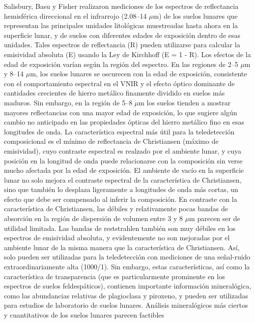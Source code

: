 \documentclass[12pt]{article}
\begin{document}
Salisbury, Basu y Fisher realizaron mediciones de los espectros de reflectancia hemisférica 
direccional en el 
infrarrojo (2.08–14 $\mu$m) de los suelos lunares que representan las 
principales unidades litológicas muestreadas hasta ahora en la superficie 
lunar, y de suelos con diferentes edades de exposición dentro de esas 
unidades. Tales espectros de reflectancia (R) pueden utilizarse para 
calcular la emisividad absoluta (E) usando la Ley de Kirchhoff (E = 1 - R). 
Los efectos de la edad de exposición varían según la región del espectro. 
En las regiones de 2–5 $\mu$m y 8–14 $\mu$m, los suelos lunares se oscurecen 
con la edad de exposición, consistente con el comportamiento espectral en el 
VNIR y el efecto óptico dominante de cantidades crecientes de hierro metálico 
finamente dividido en suelos más maduros. Sin embargo, en la región de 5–8 
$\mu$m los suelos tienden a mostrar mayores reflectancias con una mayor edad 
de exposición, lo que sugiere algún cambio no anticipado en las propiedades 
ópticas del hierro metálico fino en esas longitudes de onda. La característica 
espectral más útil para la teledetección composicional es el mínimo de 
reflectancia de Christiansen (máximo de emisividad), cuyo contraste espectral 
es realzado por el ambiente lunar, y cuya posición en la longitud de onda puede 
relacionarse con la composición sin verse mucho afectada por la edad de 
exposición. El ambiente de vacío en la superficie lunar no solo mejora el 
contraste espectral de la característica de Christiansen, sino que también lo 
desplaza ligeramente a longitudes de onda más cortas, un efecto que debe ser 
compensado al inferir la composición. En contraste con la característica de 
Christiansen, las débiles y relativamente pocas bandas de absorción 
en la región de dispersión de volumen entre 3 y 8 $\mu$m 
parecen ser de utilidad limitada. Las bandas de reststrahlen también son muy 
débiles en los espectros de emisividad absoluta, y evidentemente no son mejoradas 
por el ambiente lunar de la misma manera que la característica de Christiansen. 
Así, solo pueden ser utilizadas para la teledetección con mediciones de una 
señal-ruido extraordinariamente alta (1000/1). Sin embargo, estas características, 
así como la característica de transparencia (que es particularmente prominente en 
los espectros de suelos feldespáticos), contienen importante información 
mineralógica, como las abundancias relativas de plagioclasa y piroxeno, y pueden 
ser utilizadas para estudios de laboratorio de suelos lunares. Análisis 
mineralógicos más ciertos y cuantitativos de los suelos lunares parecen factibles 
\end{document}
